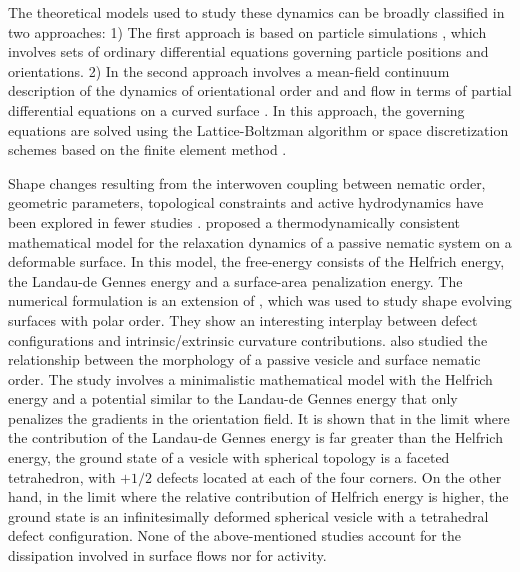 The theoretical models used to study these dynamics can be broadly classified in two approaches: 1) The first approach is based on particle simulations \cite{alaimo2017, ehrig2017,keber2014,khoromskaia2017,ellis2018}, which involves sets of  ordinary differential equations  governing particle positions and orientations. %
2) In the second approach involves a mean-field continuum description of the dynamics of orientational order and and flow in terms of partial differential equations on a curved surface \cite{vcopar2019,torres2020,zhang2020, napoli2020,pearce2020,nestler2018}. In this approach, the governing equations are solved using the Lattice-Boltzman algorithm \cite{denniston2004} or space discretization schemes based on the finite element method \cite{nestler2018}. 

Shape changes resulting from the interwoven coupling between nematic order, geometric parameters, topological constraints and active hydrodynamics have been explored in fewer studies  \cite{al2021}. \citet{nitschke2020} proposed a thermodynamically consistent mathematical model for the relaxation dynamics of a passive nematic system on a deformable surface. In this model, the free-energy consists of the Helfrich energy, the Landau-de Gennes energy and a surface-area penalization energy.  The numerical formulation is an extension of \cite{nitschke2019}, which was used to study shape evolving surfaces with polar order. They show an interesting interplay between defect configurations and intrinsic/extrinsic curvature contributions. \citet{xing2012} also studied the relationship between the morphology of a passive vesicle and surface nematic order. The study involves a minimalistic mathematical model with the Helfrich energy and a potential similar to the Landau-de Gennes energy that only penalizes the gradients in the orientation field. It is shown that in the limit where the contribution of the Landau-de Gennes energy is far greater than the Helfrich energy, the ground state of a vesicle with spherical topology is a faceted tetrahedron, with $+1/2$ defects located at each of the four corners. On the other hand, in the limit where the relative contribution of Helfrich energy is higher, the ground state is an infinitesimally deformed spherical vesicle with a tetrahedral defect configuration. None of the above-mentioned studies account for the dissipation involved in surface flows nor for activity. 

